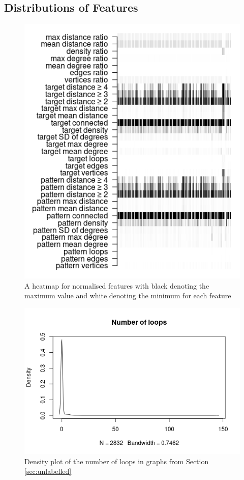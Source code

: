 \documentclass{l4proj}
\theoremstyle{definition}
\theoremstyle{remark}
\begin{document}
\subsection{Distributions of Features}

\begin{figure}
  \centering
  \includegraphics{images/features_heatmap.png}
  \caption{A heatmap for normalised features with black denoting the maximum
    value and white denoting the minimum for each feature}
  \label{fig:features_heatmap}
\end{figure}

\begin{figure}
  \centering
  \includegraphics[scale=0.7]{images/sip_loops.png}
  \caption{Density plot of the number of loops in graphs from Section
    \ref{sec:unlabelled}}
  \label{fig:loops}
\end{figure}
\end{document}
